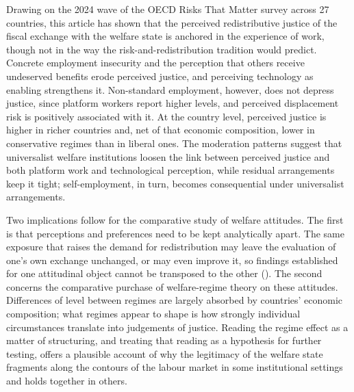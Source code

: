 \documentclass[
  12pt,
]{article}
\begin{document}
Drawing on the 2024 wave of the OECD Risks That Matter survey across 27
countries, this article has shown that the perceived redistributive
justice of the fiscal exchange with the welfare state is anchored in the
experience of work, though not in the way the risk-and-redistribution
tradition would predict. Concrete employment insecurity and the
perception that others receive undeserved benefits erode perceived
justice, and perceiving technology as enabling strengthens it.
Non-standard employment, however, does not depress justice, since
platform workers report higher levels, and perceived displacement risk
is positively associated with it. At the country level, perceived
justice is higher in richer countries and, net of that economic
composition, lower in conservative regimes than in liberal ones. The
moderation patterns suggest that universalist welfare institutions
loosen the link between perceived justice and both platform work and
technological perception, while residual arrangements keep it tight;
self-employment, in turn, becomes consequential under universalist
arrangements.

Two implications follow for the comparative study of welfare attitudes.
The first is that perceptions and preferences need to be kept
analytically apart. The same exposure that raises the demand for
redistribution may leave the evaluation of one's own exchange unchanged,
or may even improve it, so findings established for one attitudinal
object cannot be transposed to the other
(). The second
concerns the comparative purchase of welfare-regime theory on these
attitudes. Differences of level between regimes are largely absorbed by
countries' economic composition; what regimes appear to shape is how
strongly individual circumstances translate into judgements of justice.
Reading the regime effect as a matter of structuring, and treating that
reading as a hypothesis for further testing, offers a plausible account
of why the legitimacy of the welfare state fragments along the contours
of the labour market in some institutional settings and holds together
in others.
\end{document}
